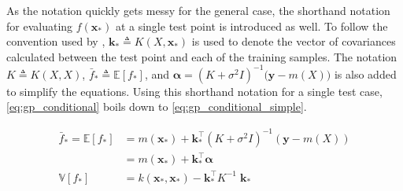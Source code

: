 As the notation quickly gets messy for the general case, the shorthand notation for evaluating $f(\boldsymbol{x}_*)$ at a single test point is introduced as well. To follow the convention used by \cite{rasmussen}, $\boldsymbol{k}_* \triangleq K(X, \boldsymbol{x}_*)$ is used to denote the vector of covariances calculated between the test point and each of the training samples. The notation $K \triangleq K(X, X)$, $\bar{f}_* \triangleq \mathbb{E}[f_*]$, and $\boldsymbol{\alpha} = (K + \sigma^2 I)^{-1} \big(\boldsymbol{y} - m(X)\big)$ is also added to simplify the equations. Using this shorthand notation for a single test case, \cref{eq:gp_conditional} boils down to \cref{eq:gp_conditional_simple}.

\begin{subequations}\label{eq:gp_conditional_simple}
\begin{align}
    \bar{f}_* = \mathbb{E}[f_*]  &= m(\boldsymbol{x}_*) + \boldsymbol{k}_*^\intercal ( K + \sigma^2 I)^{-1} (\boldsymbol{y} - m(X))\label{eq:gp_conditional_mean_simple}\\
     &= m(\boldsymbol{x}_*) + \boldsymbol{k}_*^\intercal \boldsymbol{\alpha}\\
    \mathbb{V}[f_*] &= k(\boldsymbol{x}_*, \boldsymbol{x}_*) - \boldsymbol{k}_*^\intercal K^{-1} \; \boldsymbol{k}_*\label{eq:gp_conditional_var_simple}
\end{align}
\end{subequations}

